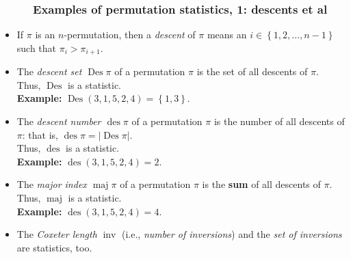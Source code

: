 \documentclass{beamer}
\newcommand{\Des}{\operatorname{Des}}
\newcommand{\des}{\operatorname{des}}
\newcommand{\maj}{\operatorname{maj}}
\newcommand{\fti}[1]{\frametitle{\ \ \ \ \ #1}}
\newcommand{\set}[1]{\left\{ #1 \right\}}
\newcommand{\abs}[1]{\left| #1 \right|}
\newcommand{\tup}[1]{\left( #1 \right)}
\newcommand{\defn}[1]{{\color{darkred}\emph{#1}}} %
\theoremstyle{plain}
\begin{document}
\begin{frame}
\fti{Examples of permutation statistics, 1: descents et al}

\begin{itemize}

\item If $\pi$ is an $n$-permutation, then a \defn{descent} of $\pi$
      means an $i \in \set{1, 2, \ldots, n-1}$ such that
      $\pi_i > \pi_{i+1}$.

\item The \defn{descent set $\Des \pi$} of a permutation $\pi$ is
      the set of all descents of $\pi$. \\
      Thus, \defn{$\Des$} is a statistic. \\
      \textbf{Example:} $\Des \tup{3, 1, 5, 2, 4} = \set{1, 3}$.

\pause

\item The \defn{descent number $\des \pi$} of a permutation $\pi$
      is the number of all descents of $\pi$: that is,
      $\des \pi = \abs{\Des \pi}$. \\
      Thus, \defn{$\des$} is a statistic. \\
      \textbf{Example:} $\des \tup{3, 1, 5, 2, 4} = 2$.

\pause

\item The \defn{major index $\maj \pi$} of a permutation $\pi$
      is the \textbf{sum} of all descents of $\pi$. \\
      Thus, \defn{$\maj$} is a statistic. \\
      \textbf{Example:} $\des \tup{3, 1, 5, 2, 4} = 4$.

\pause

\item The \defn{Coxeter length} $\operatorname{inv}$
      (i.e., \defn{number of inversions})
      and the \defn{set of inversions} are statistics, too.

\end{itemize}
\end{frame}
\end{document}
